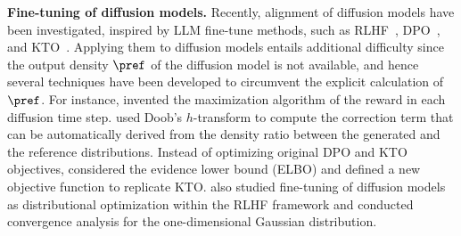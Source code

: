 \vspace{-1mm}
\textbf{Fine-tuning of diffusion models.}\quad
Recently, alignment of diffusion models have been investigated, inspired by LLM fine-tune methods, such as RLHF~\citep{ziegler2020LLMft}, DPO~\citep{rafailov2023DPO}, and KTO~\citep{ethayarajh2024KTO}. Applying them to diffusion models entails additional difficulty since the output density $\pref$ of the diffusion model is not available, and hence several techniques have been developed to circumvent the explicit calculation of $\pref$. 
For instance, \cite{fan2023reward,black2024reward,clark2024reward} invented the maximization algorithm of the reward in each diffusion time step. \cite{uehara2024reward} used Doob's $h$-transform to compute the correction term that can be automatically derived from the density ratio between the generated and the reference distributions. Instead of optimizing original DPO and KTO objectives, \cite{Wallace2024DiffusionDPO} considered the evidence lower bound (ELBO) and \cite{li2024diffusionKTO} defined a new objective function to replicate KTO.
\revisedStart
\cite{marion2024implicit} also studied fine-tuning of diffusion models as distributional optimization within the RLHF framework and conducted convergence analysis for the one-dimensional Gaussian distribution.\revisedEnd






